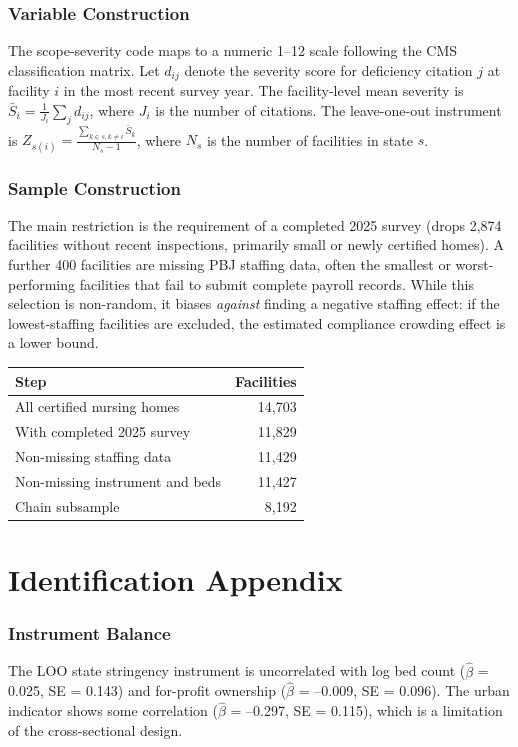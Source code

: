\documentclass[12pt]{article}
\begin{document}
\subsubsection*{Variable Construction} The scope-severity code maps to a numeric 1--12 scale following the CMS classification matrix. Let $d_{ij}$ denote the severity score for deficiency citation $j$ at facility $i$ in the most recent survey year. The facility-level mean severity is $\bar{S}_i = \frac{1}{J_i} \sum_j d_{ij}$, where $J_i$ is the number of citations. The leave-one-out instrument is $Z_{s(i)} = \frac{\sum_{k \in s, k \neq i} \bar{S}_k}{N_s - 1}$, where $N_s$ is the number of facilities in state $s$.

\subsubsection*{Sample Construction} The main restriction is the requirement of a completed 2025 survey (drops 2,874 facilities without recent inspections, primarily small or newly certified homes). A further 400 facilities are missing PBJ staffing data, often the smallest or worst-performing facilities that fail to submit complete payroll records. While this selection is non-random, it biases \textit{against} finding a negative staffing effect: if the lowest-staffing facilities are excluded, the estimated compliance crowding effect is a lower bound.

\begin{tabular}{lr}
\toprule
Step & Facilities \\
\midrule
All certified nursing homes & 14,703 \\
With completed 2025 survey & 11,829 \\
Non-missing staffing data & 11,429 \\
Non-missing instrument and beds & 11,427 \\
Chain subsample & 8,192 \\
\bottomrule
\end{tabular}

\section{Identification Appendix}

\subsubsection*{Instrument Balance} The LOO state stringency instrument is uncorrelated with log bed count ($\hat{\beta}$ = 0.025, SE = 0.143) and for-profit ownership ($\hat{\beta}$ = --0.009, SE = 0.096). The urban indicator shows some correlation ($\hat{\beta}$ = --0.297, SE = 0.115), which is a limitation of the cross-sectional design.
\end{document}
